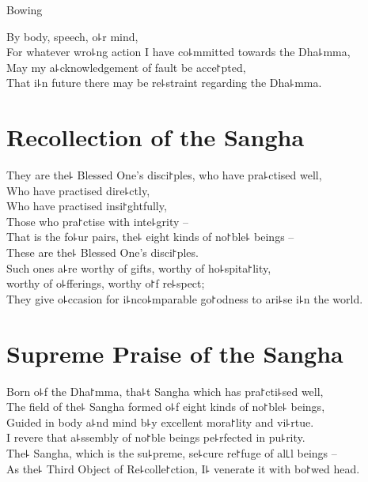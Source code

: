 \clearpage

\begin{instruction}%
  Bowing
\end{instruction}

By body, speech, o꜕r mind,\\
For whatever wro꜕ng action I have co꜕mmitted towards the Dha꜕mma,\\
May my a꜕cknowledgement of fault be acce꜓pted,\\
That i꜕n future there may be re꜕straint regarding the Dha꜕mma.

\chapter{Recollection of the Sangha}%

\begin{leader}
\end{leader}

They are the꜕ Blessed One's disci꜓ples, who have pra꜕ctised well,\\
Who have practised dire꜕ctly,\\
Who have practised insi꜓ghtfully,\\
Those who pra꜓ctise with inte꜕grity --\\
That is the fo꜕ur pairs, the꜕ eight kinds of no꜓ble꜕ beings --\\
These are the꜕ Blessed One's disci꜓ples.\\
Such ones a꜕re worthy of gifts, worthy of ho꜕spita꜓lity,\\
\vin worthy of o꜕fferings, worthy o꜓f re꜕spect;\\
They give o꜕ccasion for i꜕nco꜕mparable go꜓odness to ari꜕se i꜕n the world.

\chapter{Supreme Praise of the Sangha}%

\begin{leader}
\end{leader}

Born o꜕f the Dha꜓mma, tha꜕t Sangha which has pra꜓cti꜕sed well,\\
The field of the꜕ Sangha formed o꜕f eight kinds of no꜓ble꜕ beings,\\
Guided in body a꜕nd mind b꜕y excellent mora꜓lity and vi꜕rtue.\\
I revere that a꜕ssembly of no꜓ble beings pe꜕rfected in pu꜕rity.\\
The꜕ Sangha, which is the su꜕preme, se꜕cure re꜓fuge of al꜖l beings --\\
As the꜕ Third Object of Re꜕colle꜓ction, I꜕ venerate it with bo꜓wed head.

